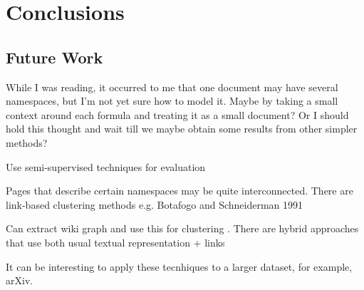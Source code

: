 \section{Conclusions}


\subsection{Future Work}


While I was reading, it occurred to me that one document may have several namespaces, but I'm not yet sure how to model it. Maybe by taking a small context around each formula and treating it as a small document? Or I should hold this thought and wait till we maybe obtain some results from other simpler methods?



Use semi-supervised techniques for evaluation



Pages that describe certain namespaces may be quite interconnected.
There are link-based clustering methods e.g. Botafogo and Schneiderman 1991

Can extract wiki graph and use this for clustering .
There are hybrid approaches that use both usual textual representation  + links
\cite{oikonomakou2005review}


It can be interesting to apply these tecnhiques to a larger dataset, for example, arXiv.
